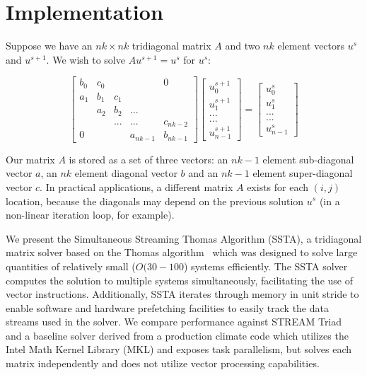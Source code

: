 \documentclass{sig-alternate-05-2015}
\begin{document}
\section{Implementation}
\label{sec:implementation}

Suppose we have an \(nk \times nk\) tridiagonal matrix \(A\) and two \(nk\) element
  vectors \(u^{s}\) and \(u^{s+1}\).  We wish to solve \(Au^{s+1} = u^{s}\) for
  \(u^{s}\):

\[
\begin{bmatrix}
b_0 & c_0 &     &          & 0        \\
a_1 & b_1 & c_1 &          &          \\
    & a_2 & b_2 & ...      &          \\
    &     & ... & ...      & c_{nk-2} \\
0   &     &     & a_{nk-1} & b_{nk-1}
\end{bmatrix}
\begin{bmatrix}
u^{s+1}_0     \\
u^{s+1}_1     \\
...     \\
...     \\
u^{s+1}_{n-1}
\end{bmatrix}
=
\begin{bmatrix}
u^{s}_0     \\
u^{s}_1     \\
...     \\
...     \\
u^{s}_{n-1}
\end{bmatrix}
\]

Our matrix \(A\) is stored as a set of three vectors: an \(nk-1\) element
  sub-diagonal vector \(a\), an \(nk\) element diagonal vector \(b\) and an
  \(nk-1\) element super-diagonal vector \(c\).
In practical applications, a different matrix \(A\) exists for each \((i,j)\)
  location, because the diagonals may depend on the previous solution \(u^{s}\)
  (in a non-linear iteration loop, for example).

We present the Simultaneous Streaming Thomas Algorithm (SSTA), a tridiagonal
  matrix solver based on the Thomas
  algorithm~\cite{ConteEtAlElementaryNumericalAnalysis,QuarteroniEtAl2007,TDMA}
  which was designed to solve large quantities of relatively small (\(O(30-100\))
  systems efficiently.
The SSTA solver computes the solution to multiple systems simultaneously, facilitating
  the use of vector instructions.
Additionally, SSTA iterates through memory in unit stride to enable software and 
  hardware prefetching facilities to easily track the data streams used in the solver.
We compare performance against STREAM Triad~\cite{stream} and a baseline solver
  derived from a production climate code which utilizes the Intel Math Kernel
  Library (MKL) and exposes task parallelism, but solves each matrix
  independently and does not utilize vector processing capabilities.
\end{document}

